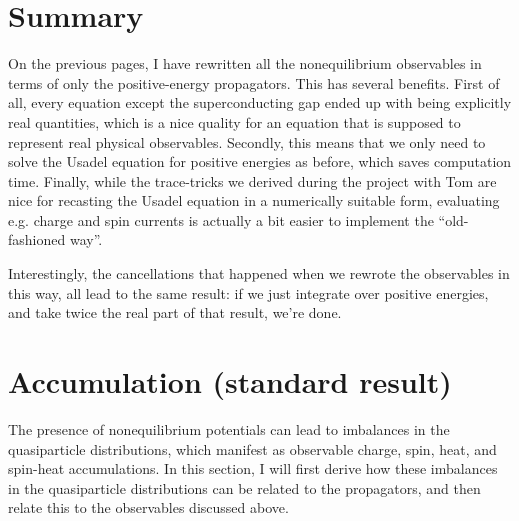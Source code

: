 \section{Summary}
On the previous pages, I have rewritten all the nonequilibrium observables in terms of only the positive-energy propagators.
This has several benefits.
First of all, every equation except the superconducting gap ended up with being explicitly real quantities, which is a nice quality for an equation that is supposed to represent real physical observables.
Secondly, this means that we only need to solve the Usadel equation for positive energies as before, which saves computation time.
Finally, while the trace-tricks we derived during the project with Tom are nice for recasting the Usadel equation in a numerically suitable form, evaluating e.g. charge and spin currents is actually a bit easier to implement the ``old-fashioned way''.

Interestingly, the cancellations that happened when we rewrote the observables in this way, all lead to the same result: if we just integrate over positive energies, and take twice the real part of that result, we're done.







\clearpage
\section{Accumulation (standard result)}
The presence of nonequilibrium potentials can lead to imbalances in the quasiparticle distributions, which manifest as observable charge, spin, heat, and spin-heat accumulations.
In this section, I will first derive how these imbalances in the quasiparticle distributions can be related to the propagators, and then relate this to the observables discussed above.

